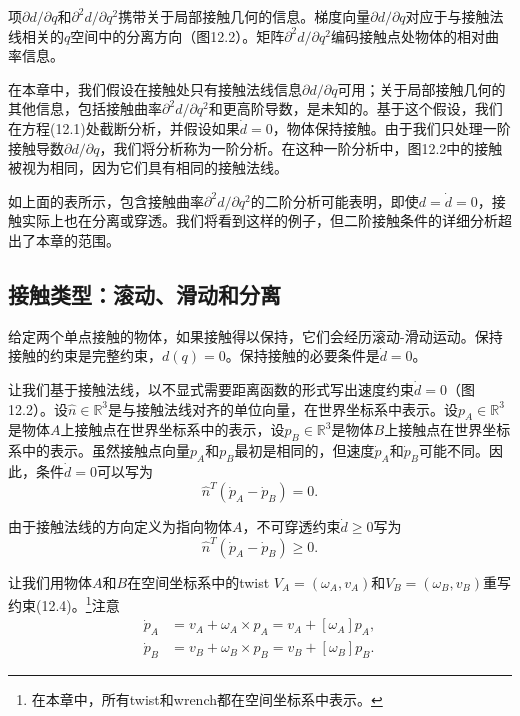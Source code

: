 \documentclass[12pt,a4paper]{article}
\begin{document}
项$\partial d/\partial q$和$\partial^2 d/\partial q^2$携带关于局部接触几何的信息。梯度向量$\partial d/\partial q$对应于与接触法线相关的$q$空间中的分离方向（图12.2）。矩阵$\partial^2 d/\partial q^2$编码接触点处物体的相对曲率信息。

在本章中，我们假设在接触处只有接触法线信息$\partial d/\partial q$可用；关于局部接触几何的其他信息，包括接触曲率$\partial^2 d/\partial q^2$和更高阶导数，是未知的。基于这个假设，我们在方程(12.1)处截断分析，并假设如果$\dot{d} = 0$，物体保持接触。由于我们只处理一阶接触导数$\partial d/\partial q$，我们将分析称为一阶分析。在这种一阶分析中，图12.2中的接触被视为相同，因为它们具有相同的接触法线。

如上面的表所示，包含接触曲率$\partial^2 d/\partial q^2$的二阶分析可能表明，即使$d = \dot{d} = 0$，接触实际上也在分离或穿透。我们将看到这样的例子，但二阶接触条件的详细分析超出了本章的范围。

\subsection{接触类型：滚动、滑动和分离}
\label{subsec:contact_types}

给定两个单点接触的物体，如果接触得以保持，它们会经历滚动-滑动运动。保持接触的约束是完整约束，$d(q) = 0$。保持接触的必要条件是$\dot{d} = 0$。

让我们基于接触法线，以不显式需要距离函数的形式写出速度约束$\dot{d} = 0$（图12.2）。设$\hat{n} \in \mathbb{R}^3$是与接触法线对齐的单位向量，在世界坐标系中表示。设$p_A \in \mathbb{R}^3$是物体$A$上接触点在世界坐标系中的表示，设$p_B \in \mathbb{R}^3$是物体$B$上接触点在世界坐标系中的表示。虽然接触点向量$p_A$和$p_B$最初是相同的，但速度$\dot{p}_A$和$\dot{p}_B$可能不同。因此，条件$\dot{d} = 0$可以写为
\begin{equation}
\hat{n}^T (\dot{p}_A - \dot{p}_B) = 0.
\label{eq:12.3}
\end{equation}

由于接触法线的方向定义为指向物体$A$，不可穿透约束$\dot{d} \geq 0$写为
\begin{equation}
\hat{n}^T (\dot{p}_A - \dot{p}_B) \geq 0.
\label{eq:12.4}
\end{equation}

让我们用物体$A$和$B$在空间坐标系中的twist $V_A = (\omega_A, v_A)$和$V_B = (\omega_B, v_B)$重写约束(12.4)。\footnote{在本章中，所有twist和wrench都在空间坐标系中表示。}注意
\begin{align}
\dot{p}_A &= v_A + \omega_A \times p_A = v_A + [\omega_A]p_A, \\
\dot{p}_B &= v_B + \omega_B \times p_B = v_B + [\omega_B]p_B.
\end{align}
\end{document}
